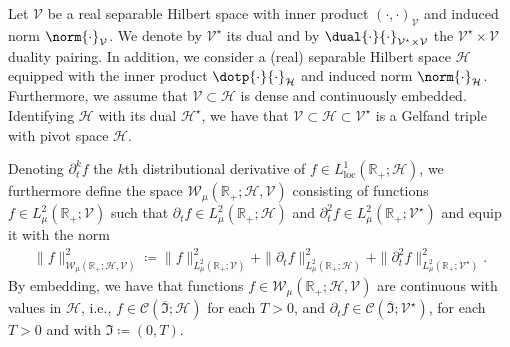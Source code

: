 Let $\mathcal{V}$ be a real separable Hilbert space with inner product $(\cdot,\cdot)_\mathcal{V}$ and induced norm $\norm{\cdot}_{\mathcal{V}}$. 
We denote by $\mathcal{V}^\star$ its dual and by $\dual{\cdot}{\cdot}_{\mathcal{V}^\star \times \mathcal{V}}$ the $\mathcal{V}^{\star} \times \mathcal{V}$
duality pairing. 
In addition, we consider a (real) separable Hilbert space $\mathcal{H}$ equipped with the inner product $\dotp{\cdot}{\cdot}_{\mathcal{H}}$ and
induced norm $\norm{\cdot}_{\mathcal{H}}$.
Furthermore, we assume that $\mathcal{V}\subset\mathcal{H}$ is dense and continuously embedded.
Identifying $\mathcal{H}$ with its dual $\mathcal{H}^\star$, we have that $\mathcal{V}\subset\mathcal{H}\subset \mathcal{V}^\star$ is a Gelfand triple with pivot space $\mathcal{H}$.

Denoting $\partial_t^k f$ the $k$th distributional derivative of
$f\in L^1_{\text{loc}}(\mathbb{R}_+;\mathcal{H})$, we furthermore define the space
$\mathcal{W}_\mu(\mathbb{R}_+;\mathcal{H},\mathcal{V})$ consisting of functions $f\in L^2_\mu(\mathbb{R}_+;\mathcal{V})$
such that $\partial_t f \in L^2_\mu(\mathbb{R}_+;\mathcal{H})$ and
$\partial_t^2 f \in L^2_\mu(\mathbb{R}_+;\mathcal{V}^\star)$ and equip it with the norm
\begin{align*}
	\|f\|_{\mathcal{W}_\mu(\mathbb{R}_+;\mathcal{H},\mathcal{V})}^2 
	\coloneqq
	\|f\|_{L^2_\mu(\mathbb{R}_+;\mathcal{V})}^2
	+
	\|\partial_t f\|_{L^2_\mu(\mathbb{R}_+;\mathcal{H})}^2
	+
	\|\partial_t^2 f\|_{L^2_\mu(\mathbb{R}_+;\mathcal{V}^\star)}^2.
\end{align*}
By embedding, we have that functions $f\in \mathcal{W}_\mu(\mathbb{R}_+;\mathcal{H},\mathcal{V})$
are continuous with values in $\mathcal{H}$, i.e., $f\in \mathscr{C}(\overline{\mathfrak{I}};\mathcal{H})$ for each $T>0$, and $\partial_t f\in \mathscr{C}(\overline{\mathfrak{I}};\mathcal{V}^\star)$, for each $T>0$ and with $\mathfrak{I} \coloneqq (0,T)$.
%
